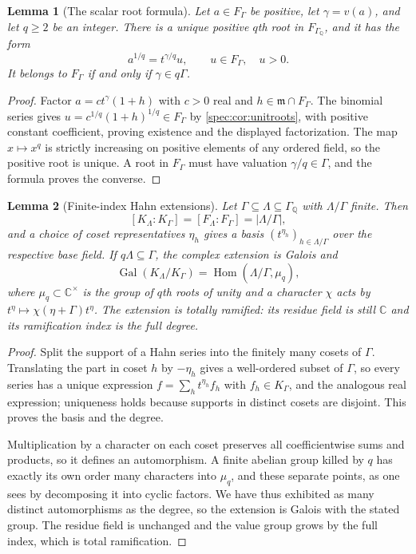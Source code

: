 \documentclass[11pt,a4paper]{article}
\numberwithin{equation}{section}
\newtheorem{lemma}[lemma]{Lemma}
\theoremstyle{definition}
\theoremstyle{remark}
\newcommand{\C}{\mathbb C}
\newcommand{\Q}{\mathbb Q}
\newcommand{\mm}{\mathfrak m}
\newcommand{\Hom}{\operatorname{Hom}}
\newcommand{\Gal}{\operatorname{Gal}}
\begin{document}
\begin{lemma}[The scalar root formula]\label{spec:lem:scalarroot}
Let $a\in F_\Gamma$ be positive, let $\gamma=v(a)$, and let $q\ge2$ be an
integer. There is a unique positive $q$th root in $F_{\Gamma_\Q}$, and it
has the form
\begin{equation}\label{spec:eq:scalarroot}
 a^{1/q}=t^{\gamma/q}u,\qquad u\in F_\Gamma,\quad u>0.
\end{equation}
It belongs to $F_\Gamma$ if and only if $\gamma\in q\Gamma$.
\end{lemma}
\begin{proof}
Factor $a=ct^\gamma(1+h)$ with $c>0$ real and $h\in\mm\cap F_\Gamma$. The
binomial series gives $u=c^{1/q}(1+h)^{1/q}\in F_\Gamma$ by
\cref{spec:cor:unitroots}, with positive constant coefficient, proving
existence and the displayed factorization. The map $x\mapsto x^q$ is
strictly increasing on positive elements of any ordered field, so the
positive root is unique. A root in $F_\Gamma$ must have valuation
$\gamma/q\in\Gamma$, and the formula proves the converse.
\end{proof}

\begin{lemma}[Finite-index Hahn extensions]\label{spec:lem:finiteindex}
Let $\Gamma\subseteq\Lambda\subseteq\Gamma_\Q$ with $\Lambda/\Gamma$ finite.
Then
\begin{equation}\label{spec:eq:finiteindex}
 [K_\Lambda:K_\Gamma]=[F_\Lambda:F_\Gamma]=|\Lambda/\Gamma|,
\end{equation}
and a choice of coset representatives $\eta_h$ gives a basis
$(t^{\eta_h})_{h\in\Lambda/\Gamma}$ over the respective base field. If
$q\Lambda\subseteq\Gamma$, the complex extension is Galois and
\begin{equation}\label{spec:eq:galois}
 \Gal(K_\Lambda/K_\Gamma)=\Hom(\Lambda/\Gamma,\mu_q),
\end{equation}
where $\mu_q\subset\C^\times$ is the group of $q$th roots of unity and a
character $\chi$ acts by $t^\eta\mapsto\chi(\eta+\Gamma)t^\eta$. The
extension is totally ramified: its residue field is still $\C$ and its
ramification index is the full degree.
\end{lemma}
\begin{proof}
Split the support of a Hahn series into the finitely many cosets of
$\Gamma$. Translating the part in coset $h$ by $-\eta_h$ gives a
well-ordered subset of $\Gamma$, so every series has a unique expression
$f=\sum_h t^{\eta_h}f_h$ with $f_h\in K_\Gamma$, and the analogous real
expression; uniqueness holds because supports in distinct cosets are
disjoint. This proves the basis and the degree.

Multiplication by a character on each coset preserves all coefficientwise
sums and products, so it defines an automorphism. A finite abelian group
killed by $q$ has exactly its own order many characters into $\mu_q$, and
these separate points, as one sees by decomposing it into cyclic factors.
We have thus exhibited as many distinct automorphisms as the degree, so the
extension is Galois with the stated group. The residue field is unchanged
and the value group grows by the full index, which is total ramification.
\end{proof}
\end{document}
